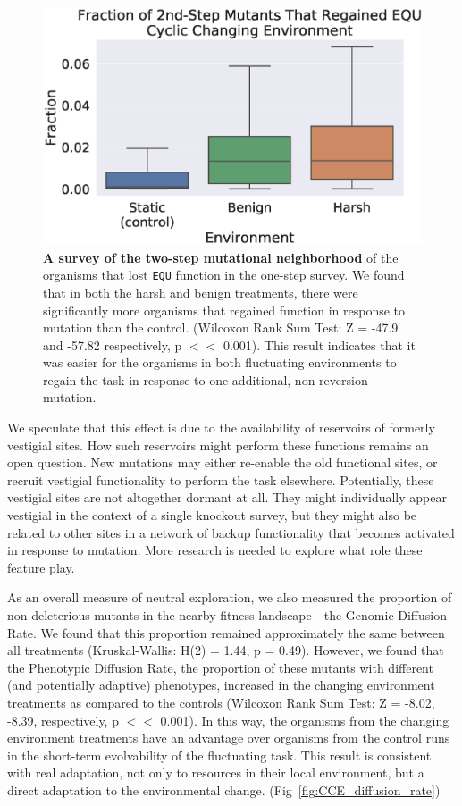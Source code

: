 \documentclass[10pt,letterpaper,final]{article}
\begin{document}
	\begin{figure}[!h] %
	\includegraphics[width=0.95\columnwidth]{figures/CE/fig12.eps}
	\caption{\textbf{A survey of the two-step mutational neighborhood} of the organisms that lost \texttt{EQU} function in the one-step survey. We found that in both the harsh and benign treatments, there were significantly more organisms that regained function in response to mutation than the control. (Wilcoxon Rank Sum Test: Z = -47.9 and -57.82 respectively, p $<<$ 0.001). This result indicates that it was easier for the organisms in both fluctuating environments to regain the task in response to one additional, non-reversion mutation.   
	}\label{fig:CCE_two_step}
	\end{figure}

We speculate that this effect is due to the availability of reservoirs of formerly vestigial sites. How such reservoirs might perform these functions remains an open question. New mutations may either re-enable the old functional sites, or recruit vestigial functionality to perform the task elsewhere. Potentially, these vestigial sites are not altogether dormant at all. They might individually appear vestigial in the context of a single knockout survey, but they might also be related to other sites in a network of backup functionality that becomes activated in response to mutation. More research is needed to explore what role these feature play. 






As an overall measure of neutral exploration, we also measured the proportion of non-deleterious mutants in the nearby fitness landscape - the Genomic Diffusion Rate. We found that this proportion remained approximately the same between all treatments (Kruskal-Wallis: H(2) = 1.44, p = 0.49). However, we found that the Phenotypic Diffusion Rate, the proportion of these mutants with different (and potentially adaptive) phenotypes, increased in the changing environment treatments as compared to the controls (Wilcoxon Rank Sum Test: Z = -8.02, -8.39, respectively, p $<<$ 0.001). In this way, the organisms from the changing environment treatments have an advantage over organisms from the control runs in the short-term evolvability of the fluctuating task. This result is consistent with real adaptation, not only to resources in their local environment, but a direct adaptation to the environmental change. (Fig~\ref{fig:CCE_diffusion_rate})
\end{document}
